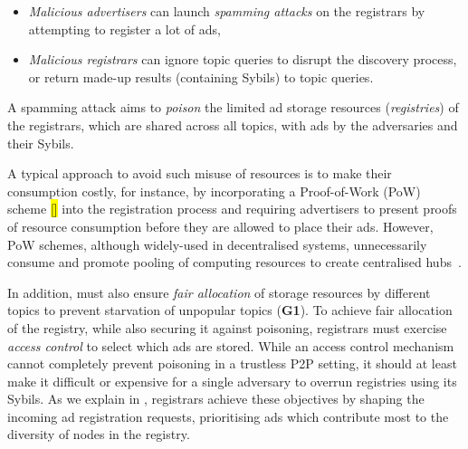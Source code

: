 


\begin{itemize}
 \item \textit{Malicious advertisers} can launch \textit{spamming attacks} on the registrars by attempting to register a lot of ads,
 \item \textit{Malicious registrars} can ignore topic queries to disrupt the discovery process, or return made-up results (\eg containing Sybils) to topic queries.
\end{itemize}

A spamming attack aims to \textit{poison} the limited ad storage resources (\ie \textit{registries}) of the registrars, which are shared across all topics, with ads by the adversaries and their Sybils.


A typical approach to avoid such misuse of resources is to make their consumption costly, for instance, by incorporating a Proof-of-Work (PoW) scheme \hl{[]} into the registration process and requiring advertisers to present proofs of resource consumption before they are allowed to place their ads. However, PoW schemes, although widely-used in decentralised systems, unnecessarily consume and promote pooling of computing resources to create centralised hubs~\cite{gervais2014bitcoin}.

In addition, \sysname must also ensure \textit{fair allocation} of storage resources by different topics to prevent starvation of unpopular topics (\textbf{G1}). To achieve fair allocation of the registry, while also securing it against poisoning, registrars must exercise \textit{access control} to select which ads are stored. While an access control mechanism cannot completely prevent poisoning in a trustless P2P setting, it should at least make it difficult or expensive for a single adversary to overrun registries using its Sybils. As we explain in , registrars achieve these objectives by shaping the incoming ad registration requests, prioritising ads which contribute most to the diversity of nodes in the registry.

